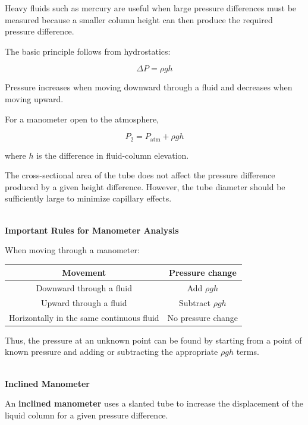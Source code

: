 \documentclass[12pt]{article}
\begin{document}
Heavy fluids such as mercury are useful when large pressure differences must be measured because a smaller column height can then produce the required pressure difference.

The basic principle follows from hydrostatics:

\begin{equation*}
    \Delta P = \rho gh
\end{equation*}

Pressure increases when moving downward through a fluid and decreases when moving upward.

For a manometer open to the atmosphere,

\begin{equation*}
    P_2 = P_{\mathrm{atm}} + \rho gh
\end{equation*}

where $h$ is the difference in fluid-column elevation.

The cross-sectional area of the tube does not affect the pressure difference produced by a given height difference. However, the tube diameter should be sufficiently large to minimize capillary effects.

\textbf{\\ Important Rules for Manometer Analysis}

When moving through a manometer:
\begin{center}
    \begin{tabular}{|c|c|}
        \hline
        \textbf{Movement} & \textbf{Pressure change} \\
        \hline
        Downward through a fluid & Add $\rho gh$ \\
        \hline
        Upward through a fluid & Subtract $\rho gh$ \\
        \hline
        Horizontally in the same continuous fluid & No pressure change \\
        \hline
    \end{tabular}
\end{center}

Thus, the pressure at an unknown point can be found by starting from a point of known pressure and adding or subtracting the appropriate $\rho gh$ terms.



\textbf{\\ Inclined Manometer}

An \textbf{inclined manometer} uses a slanted tube to increase the displacement of the liquid column for a given pressure difference.
\end{document}
